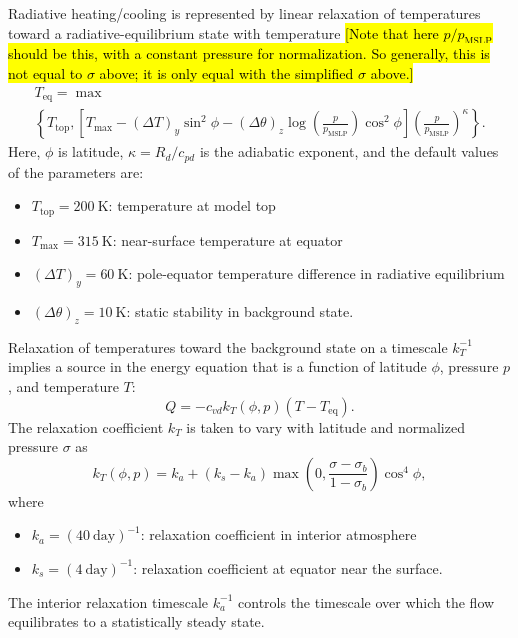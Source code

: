 \documentclass{report}
\begin{document}
Radiative heating/cooling is represented by linear relaxation of temperatures toward a radiative-equilibrium state with temperature \hl{[Note that here $p/p_{\mathrm{MSLP}}$ should be this, with a constant pressure for normalization. So generally, this is not equal to $\sigma$ above; it is only equal with the simplified $\sigma$ above.]}
\begin{multline}
    T_{\mathrm{eq}} = \max \\
    \left\{ T_{\mathrm{top}}, \left[ T_{\max} - (\Delta T)_y \sin^2 \phi - (\Delta \theta)_z \log\left(\frac{p}{p_{\mathrm{MSLP}}}\right) \cos^2 \phi \right]
    \left( \frac{p}{p_{\mathrm{MSLP}}} \right)^{\kappa} \right\}.
\end{multline}
Here, $\phi$ is latitude, $\kappa = R_d/c_{pd}$ is the adiabatic exponent, and the default values of the parameters are:
\begin{itemize}
    \item $T_{\mathrm{top}} = 200~\mathrm{K}$: temperature at model top
    \item $T_{\max} = 315~\mathrm{K}$: near-surface temperature at equator
    \item $(\Delta T)_y = 60~\mathrm{K}$: pole-equator temperature difference in radiative equilibrium
    \item $(\Delta \theta)_z = 10~\mathrm{K}$: static stability in background state.
\end{itemize}

Relaxation of temperatures toward the background state on a timescale $k_T^{-1}$ implies a source in the energy equation that is a function of latitude $\phi$, pressure $p$, and temperature $T$:
\begin{equation}
    Q =  - c_{vd} k_T(\phi, p) (T - T_{\mathrm{eq}}).
\end{equation} 
The relaxation coefficient $k_T$ is taken to vary with latitude and normalized pressure $\sigma$ as
\begin{equation}
k_T(\phi, p) = k_a + (k_s - k_a) \max\left(0, \frac{\sigma - \sigma_b}{1-\sigma_b}\right) \cos^4 \phi ,
\end{equation}
where 
\begin{itemize}
    \item $k_a = (40~\mathrm{day})^{-1}$: relaxation coefficient in interior atmosphere
    \item $k_s = (4~\mathrm{day})^{-1}$: relaxation coefficient  at equator near the surface.
\end{itemize}
The interior relaxation timescale $k_a^{-1}$ controls the timescale over which the flow equilibrates to a statistically steady state.
\end{document}
